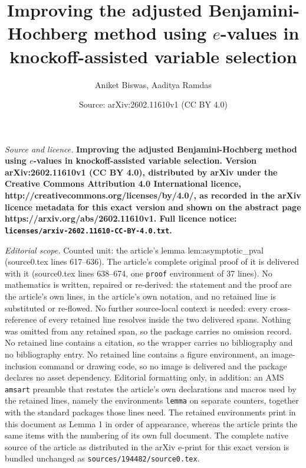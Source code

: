 \documentclass[10pt,a4paper]{amsart}
\title{\Large\bfseries Improving the adjusted Benjamini-Hochberg method using $e$-values in knockoff-assisted variable selection}
\author{Aniket Biswas, Aaditya Ramdas}
\date{Source: arXiv:2602.11610v1 (CC BY 4.0)}
\begin{document}
\maketitle

\noindent\emph{Source and licence.} \Large\bfseries Improving the adjusted Benjamini-Hochberg method using $e$-values in knockoff-assisted variable selection. Version arXiv:2602.11610v1 (CC BY 4.0), distributed by arXiv under the Creative Commons Attribution 4.0 International licence, http://creativecommons.org/licenses/by/4.0/, as recorded in the arXiv licence metadata for this exact version and shown on the abstract page https://arxiv.org/abs/2602.11610v1. Full licence notice: \texttt{licenses/arxiv-2602.11610-CC-BY-4.0.txt}.\par\smallskip

\noindent\textit{Editorial scope.} Counted unit: the article's lemma lem:asymptotic\_pval (source0.tex lines 617--636). The article's complete original proof of it is delivered with it (source0.tex lines 638--674, one \texttt{proof} environment of 37 lines). No mathematics is written, repaired or re-derived: the statement and the proof are the article's own lines, in the article's own notation, and no retained line is substituted or re-flowed.  No further source-local context is needed: every cross-reference of every retained line resolves inside the two delivered spans.  Nothing was omitted from any retained span, so the package carries no omission record.  No retained line contains a citation, so the wrapper carries no bibliography and no bibliography entry.  No retained line contains a figure environment, an image-inclusion command or drawing code, so no image is delivered and the package declares no asset dependency.  Editorial formatting only, in addition: an AMS \texttt{amsart} preamble that restates the article's own declarations and macros used by the retained lines, namely the environments \texttt{lemma} on separate counters, together with the standard packages those lines need.  The retained environments print in this document as Lemma 1 in order of appearance, whereas the article prints the same items with the numbering of its own full document.  The complete native source of the article as distributed in the arXiv e-print for this exact version is bundled unchanged as \texttt{sources/194482/source0.tex}.
\end{document}
